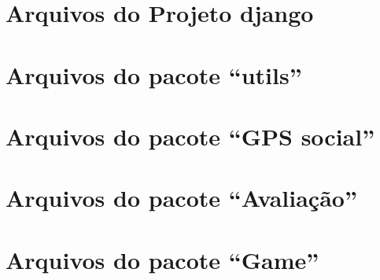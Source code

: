 \section{Arquivos do Projeto \gls{django}}


\clearpage
\section{Arquivos do pacote ``utils''}





\section{Arquivos do pacote ``GPS social''}




\clearpage
\section{Arquivos do pacote ``Avaliação''}




\clearpage
\section{Arquivos do pacote ``Game''}




